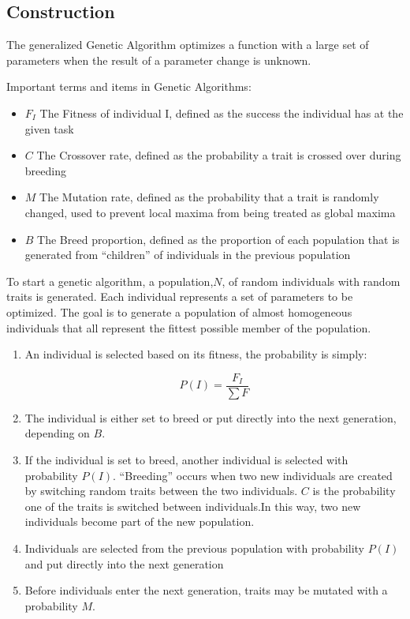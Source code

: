 \documentclass[11pt,a4paper]{article}
\begin{document}
\subsection{Construction}
\label{Genetic Algorithms:Construction}

The generalized Genetic Algorithm optimizes a function with a large set of parameters when the result of a parameter change is unknown. 

Important terms and items in Genetic Algorithms:
\begin{itemize}
\item $F_{I}$ The Fitness of individual I, defined as the success the individual has at the given task
\item $C$ The Crossover rate, defined as the probability a trait is crossed over during breeding
\item $M$ The Mutation rate, defined as the probability that a trait is randomly changed, used to prevent local maxima from being treated as global maxima
\item $B$ The Breed proportion, defined as the proportion of each population that is generated from ``children'' of individuals in the previous population
\end{itemize}

To start a genetic algorithm, a population,$N$, of random individuals with random traits is generated. Each individual represents a set of parameters to be optimized. The goal is to generate a population of almost homogeneous individuals that all represent the fittest possible member of the population.

\begin{enumerate}
\item An individual is selected based on its fitness, the probability is simply:

\[
P(I) = \frac{F_{I}}{\sum{F}}
\]

\item The individual is either set to breed or put directly into the next generation, depending on $B$.
\item If the individual is set to breed, another individual is selected with probability $P(I)$. ``Breeding'' occurs when two new individuals are created by switching random traits between the two individuals. $C$ is the probability one of the traits is switched between individuals.In this way, two new individuals become part of the new population.
\item Individuals are selected from the previous population with probability $P(I)$ and put directly into the next generation
\item Before individuals enter the next generation, traits may be mutated with a probability $M$. 
\end{enumerate}
\end{document}
